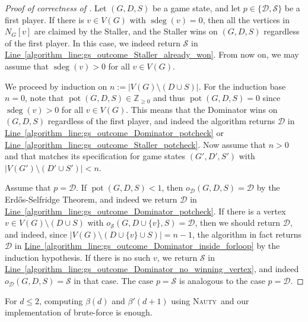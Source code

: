 \documentclass[a4paper,11pt,oneside]{scrartcl}
\theoremstyle{definition}
\theoremstyle{remark}
\newcommand{\Z}{\mathbb{Z}}
\DeclareMathOperator{\pot}{pot}
\DeclareMathOperator{\gsdeg}{sdeg}
\newcommand{\nauty}{\textsc{Nauty}}
\newcommand{\lineref}[1]{\hyperref[#1]{Line~\ref{#1}}}
\begin{document}
\begin{proof}[Proof of correctness of ]
    Let $(G,D,S)$ be a game state, and let $p\in \{\mathcal D,\mathcal S\}$ be a first player. If there is $v \in V(G)$ with $\gsdeg(v) = 0$, then all the vertices in $N_{G}[v]$ are claimed by the Staller, and the Staller wins on $(G,D,S)$ regardless of the first player. In this case, we indeed return $\mathcal S$ in \lineref{algorithm_line:gs_outcome_Staller_already_won}. From now on, we may assume that $\gsdeg(v) > 0$ for all $v \in V(G)$.
    
    We proceed by induction on $n := |V(G) \setminus (D \cup S)|$. For the induction base $n = 0$, note that $\pot(G,D,S) \in \Z_{\geq 0}$ and thus $\pot(G,D,S) = 0$ since $\gsdeg(v) > 0$ for all $v \in V(G)$. This means that the Dominator wins on $(G,D,S)$ regardless of the first player, and indeed the algorithm returns $\mathcal D$ in \lineref{algorithm_line:gs_outcome_Dominator_potcheck} or \lineref{algorithm_line:gs_outcome_Staller_potcheck}. Now assume that $n > 0$ and that  matches its specification for game states $(G',D',S')$ with $|V(G') \setminus (D' \cup S')| < n$.
        
    Assume that $p = \mathcal D$. If $\pot(G,D,S) < 1$, then $o_{\mathcal D}(G,D,S) = \mathcal D$ by the Erd\H os-Selfridge Theorem, and indeed we return $\mathcal D$ in \lineref{algorithm_line:gs_outcome_Dominator_potcheck}. If there is a vertex $v \in V(G) \setminus (D \cup S)$ with $o_{\mathcal S}(G, D \cup \{v\}, S) = \mathcal D$, then we should return $\mathcal D$, and indeed, since $|V(G) \setminus (D \cup \{v\} \cup S)| = n-1$, the algorithm in fact returns $\mathcal D$ in \lineref{algorithm_line:gs_outcome_Dominator_inside_forloop} by the induction hypothesis. If there is no such $v$, we return $\mathcal S$ in \lineref{algorithm_line:gs_outcome_Dominator_no_winning_vertex}, and indeed $o_{\mathcal D}(G, D, S) = \mathcal S$ in that case. The case $p = \mathcal S$ is analogous to the case $p = \mathcal D$. 
\end{proof}

For $d \leq 2$, computing $\beta(d)$ and $\beta'(d+1)$ using \nauty\ and our implementation of  brute-force is enough.
\end{document}
